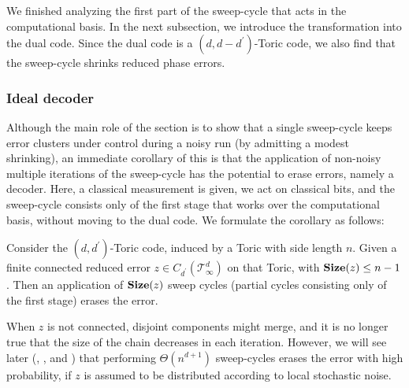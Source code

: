 We finished analyzing the first part of the sweep-cycle that acts in the computational basis. In the next subsection, we introduce the transformation into the dual code. Since the dual code is a $(d,d-d^{\prime})$-Toric code, we also find that the sweep-cycle shrinks reduced phase errors.








\subsubsection{Ideal decoder}
 Although the main role of the section is to show that a single sweep-cycle keeps error clusters under control during a noisy run (by admitting a modest shrinking), an immediate corollary of this is that the application of non-noisy multiple iterations of the sweep-cycle has the potential to erase errors, namely a decoder. Here, a classical measurement is given, we act on classical bits, and the sweep-cycle consists only of the first stage that works over the computational basis, without moving to the dual code. We formulate the corollary as follows:
\begin{corollary}
  \label{col:idealcorrection} 
  Consider the $(d,d^{\prime})$-Toric code, induced by a Toric with side length $n$. Given a finite connected reduced error $z \in C_{d^{\prime}}(\mathcal T_\infty^d)$ on that Toric, with $\mathbf{Size}(z) \le n-1$. Then an application of $\mathbf{Size}(z)$ sweep cycles (partial cycles consisting only of the first stage) erases the error.
\end{corollary}
When $z$ is not connected, disjoint components might merge, and it is no longer true that the size of the chain decreases in each iteration. However, we will see later (, , and ) that performing $\Theta(n^{d+1})$ sweep-cycles erases the error with high probability, if $z$ is assumed to be distributed according to local stochastic noise.




